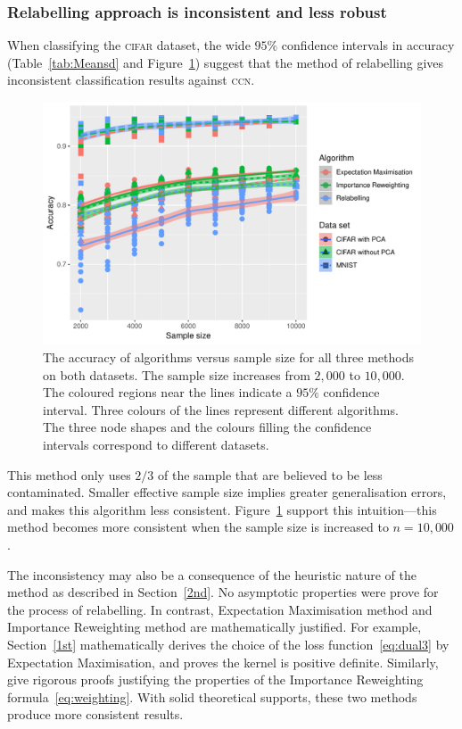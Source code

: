 \documentclass[12pt]{article} %
\begin{document}
\subsubsection{Relabelling approach is inconsistent and less robust}
When classifying the \textsc{cifar} dataset, the wide $95\%$ confidence intervals in accuracy (Table~\ref{tab:Meansd} and Figure~\ref{fig:acc}) suggest that the method of relabelling gives inconsistent classification results against \textsc{ccn}. 
\begin{figure}
	\centering
    \includegraphics[scale=.8]{accuracy}%
	\caption{The accuracy of algorithms versus sample size for all three methods on both datasets. The sample size increases from $2,000$ to $10,000$. The coloured regions near the lines indicate a $95\%$ confidence interval. Three colours of the lines represent different algorithms. The three node shapes and the colours filling the confidence intervals correspond to different datasets. 
}
	\label{fig:acc}
\end{figure}
This method only uses $2/3$ of the sample that are believed to be less contaminated. Smaller effective sample size implies greater generalisation errors, and makes this algorithm less consistent. 
Figure~\ref{fig:acc} support this intuition---this method becomes more consistent when the sample size is increased to $n=10,000$.

The inconsistency may also be a consequence of the heuristic nature of the method as described in Section~\ref{2nd}. No asymptotic properties were prove for the process of relabelling. In contrast, Expectation Maximisation method and Importance Reweighting method are mathematically justified. For example, Section~\ref{1st} mathematically derives the choice of the loss function~\eqref{eq:dual3} by Expectation Maximisation, and proves the kernel is positive definite. 
Similarly, \citet{liu2016classification} give rigorous proofs justifying the properties of the Importance Reweighting formula~\eqref{eq:weighting}. With solid theoretical supports, these two methods produce more consistent results.
\end{document}
